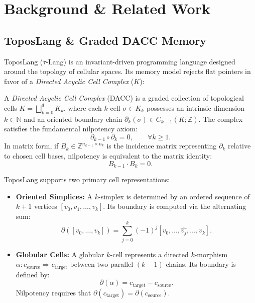 \documentclass[acmsmall,screen,nonacm]{acmart}
\begin{document}
\section{Background \& Related Work}
\label{sec:background}

\subsection{ToposLang \& Graded DACC Memory}
\label{sec:toposlang-dacc}

ToposLang ($\tau$-Lang) is an invariant-driven programming language designed around the topology of cellular spaces. Its memory model rejects flat pointers in favor of a \emph{Directed Acyclic Cell Complex} ($K$):

\begin{definition}
A \emph{Directed Acyclic Cell Complex} (DACC) is a graded collection of topological cells $K = \bigsqcup_{k=0}^d K_k$, where each $k$-cell $\sigma \in K_k$ possesses an intrinsic dimension $k \in \mathbb{N}$ and an oriented boundary chain $\partial_k(\sigma) \in C_{k-1}(K; \mathbb{Z})$. The complex satisfies the fundamental nilpotency axiom:
\[
  \partial_{k-1} \circ \partial_k = 0, \qquad \forall k \geq 1.
\]
In matrix form, if $B_k \in \mathbb{Z}^{n_{k-1} \times n_k}$ is the incidence matrix representing $\partial_k$ relative to chosen cell bases, nilpotency is equivalent to the matrix identity:
\[
  B_{k-1} \cdot B_k = 0.
\]
\end{definition}

ToposLang supports two primary cell representations:
\begin{itemize}
    \item \textbf{Oriented Simplices:} A $k$-simplex is determined by an ordered sequence of $k+1$ vertices $[v_0, v_1, \dots, v_k]$. Its boundary is computed via the alternating sum:
    \[
      \partial([v_0, \dots, v_k]) = \sum_{j=0}^k (-1)^j [v_0, \dots, \widehat{v_j}, \dots, v_k].
    \]
    \item \textbf{Globular Cells:} A globular $k$-cell represents a directed $k$-morphism $\alpha : c_\mathrm{source} \Rightarrow c_\mathrm{target}$ between two parallel $(k-1)$-chains. Its boundary is defined by:
    \[
      \partial(\alpha) = c_\mathrm{target} - c_\mathrm{source}.
    \]
    Nilpotency requires that $\partial(c_\mathrm{target}) = \partial(c_\mathrm{source})$.
\end{itemize}
\end{document}
